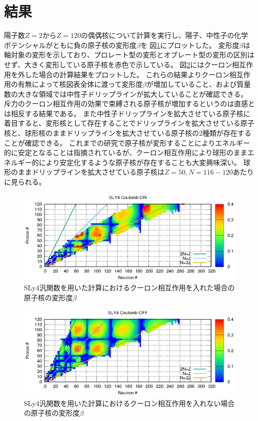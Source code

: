\documentclass[12pt]{jarticle}
\begin{document}
\section{結果}
陽子数$Z=2$から$Z=120$の偶偶核について計算を実行し、陽子、中性子の化学ポテンシャルがともに負の原子核の変形度$\beta$を 図\ref{fig:SLY4_ON}にプロットした。
変形度$\beta$は軸対象の変形を示しており、プロレート型の変形とオブレート型の変形の区別はせず、大きく変形している原子核を赤色で示している。
図\ref{fig:SLY4_OFF}にはクーロン相互作用を外した場合の計算結果をプロットした。
これらの結果よりクーロン相互作用の有無によって核図表全体に渡って変形度$\beta$が増加していること、および質量数の大きな領域では中性子ドリップラインが拡大していることが確認できる。
斥力のクーロン相互作用の効果で束縛される原子核が増加するというのは直感とは相反する結果である。
また中性子ドリップラインを拡大させている原子核に着目すると、変形核として存在することでドリップラインを拡大させている原子核と、球形核のままドリップラインを拡大させている原子核の2種類が存在することが確認できる。
これまでの研究で原子核が変形することによりエネルギー的に安定となることは指摘されているが、クーロン相互作用により球形のままエネルギー的により安定化するような原子核が存在することも大変興味深い。
球形のままドリップラインを拡大させている原子核は$Z=50,N=116-120$あたりに見られる。
\begin{figure}[ht]
    \centering
    \includegraphics{../SLY4_ON.eps}
    \setlength\floatsep{0pt}
    \setlength\intextsep{0pt} 
    \setlength\textfloatsep{0pt}
    \caption{SLy4汎関数を用いた計算におけるクーロン相互作用を入れた場合の原子核の変形度$\beta$}\label{fig:SLY4_ON}
\end{figure}
\begin{figure}[H]
    \centering
    \includegraphics{../SLY4_OFF.eps}
    \setlength\floatsep{0pt}
    \caption{SLy4汎関数を用いた計算におけるクーロン相互作用を入れない場合の原子核の変形度$\beta$}\label{fig:SLY4_OFF}
\end{figure}
\end{document}
